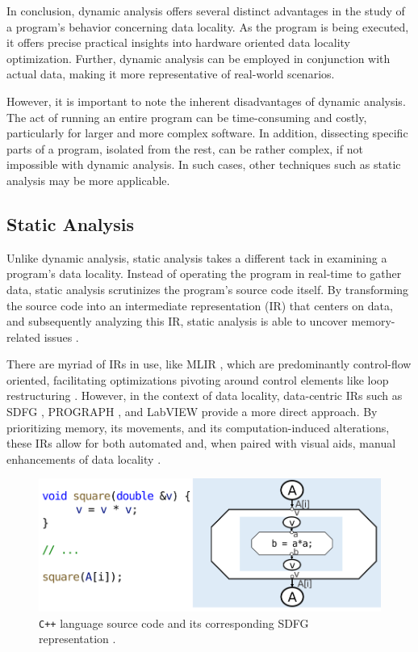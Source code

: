 In conclusion, dynamic analysis offers several distinct advantages in the study of a program's behavior concerning data locality. As the program is being executed, it offers precise practical insights into hardware oriented data locality optimization. Further, dynamic analysis can be employed in conjunction with actual data, making it more representative of real-world scenarios.

However, it is important to note the inherent disadvantages of dynamic analysis. The act of running an entire program can be time-consuming and costly, particularly for larger and more complex software. In addition, dissecting specific parts of a program, isolated from the rest, can be rather complex, if not impossible with dynamic analysis. In such cases, other techniques such as static analysis may be more applicable.

\subsection{Static Analysis}\label{sec:static_analysis}

Unlike dynamic analysis, static analysis takes a different tack in examining a program's data locality. Instead of operating the program in real-time to gather data, static analysis scrutinizes the program's source code itself. By transforming the source code into an intermediate representation (IR) that centers on data, and subsequently analyzing this IR, static analysis is able to uncover memory-related issues \cite{schaad2022boosting,schaad2021boosting,calotoiu2022lifting,ben2023bridging}.

There are myriad of IRs in use, like MLIR \cite{lattner2020mlir}, which are predominantly control-flow oriented, facilitating optimizations pivoting around control elements like loop restructuring \cite{moses2021polygeist}. However, in the context of data locality, data-centric IRs such as SDFG \cite{ben2019statefulSDFG}, PROGRAPH \cite{matwin1985prograph}, and LabVIEW \cite{kodosky2020labview} provide a more direct approach. By prioritizing memory, its movements, and its computation-induced alterations, these IRs allow for both automated \cite{ben2019statefulSDFG} and, when paired with visual aids, manual enhancements of data locality \cite{ben2023bridging,ben2019statefulSDFG,schaad2021boosting}.

\begin{figure}
  \centering
  \includegraphics[width=\linewidth]{pictures/SDFG.png}
  \caption{\texttt{C++} language source code and its corresponding SDFG representation \cite{calotoiu2022lifting}.}
  \label{fig:sdfg}
\end{figure}

